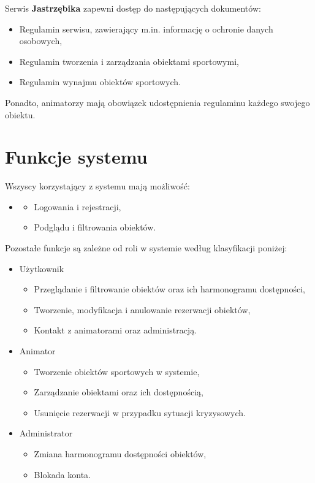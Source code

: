 \documentclass[a4paper,11pt]{article}
\begin{document}
        Serwis \textbf{Jastrzębika} zapewni dostęp do następujących dokumentów:
        \begin{itemize}
            \item Regulamin serwisu, zawierający m.in. informację o ochronie danych osobowych,
            \item Regulamin tworzenia i zarządzania obiektami sportowymi,
            \item Regulamin wynajmu obiektów sportowych.
        \end{itemize}
        
        Ponadto, animatorzy mają obowiązek udostępnienia regulaminu każdego swojego obiektu.

\section{Funkcje systemu}

    Wszyscy korzystający z systemu mają możliwość:
    \begin{itemize}
        \item[]
        \begin{itemize}
            \item Logowania i rejestracji,
            \item Podglądu i filtrowania obiektów.
        \end{itemize}
    \end{itemize}
    
    \par Pozostałe funkcje są zależne od roli w systemie według klasyfikacji poniżej:
    \begin{itemize}
        \item Użytkownik
            \begin{itemize}
                \item Przeglądanie i filtrowanie obiektów oraz ich harmonogramu dostępności,
                \item Tworzenie, modyfikacja i anulowanie rezerwacji obiektów,
                \item Kontakt z animatorami oraz administracją.
            \end{itemize}
        \item Animator
            \begin{itemize}
                \item Tworzenie obiektów sportowych w systemie,
                \item Zarządzanie obiektami oraz ich dostępnością,
                \item Usunięcie rezerwacji w przypadku sytuacji kryzysowych.
            \end{itemize}
        \item Administrator
            \begin{itemize}
                \item Zmiana harmonogramu dostępności obiektów,
                \item Blokada konta.
            \end{itemize}
    \end{itemize}
\end{document}
